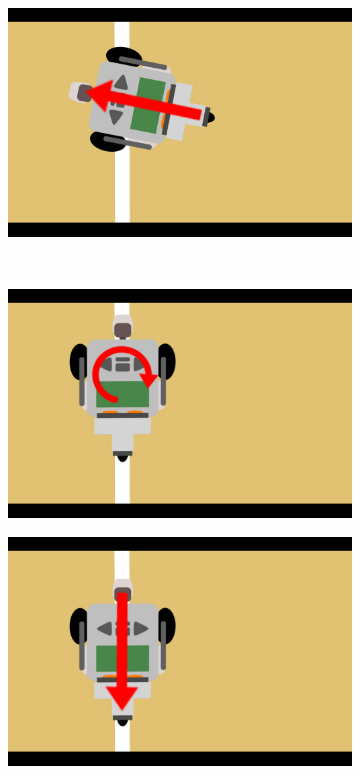 \documentclass[tt3]{penoverslag}
\begin{document}
\begin{figure}
\begin{subfigure}[h]{0.24\textwidth}
		\caption{}
		\label{fig:AlgoWit3}
	\end{subfigure}
	\begin{subfigure}[h]{0.24\textwidth}
		\includegraphics[width=\textwidth]{WitteLijn4}
		\caption{}
		\label{fig:AlgoWit4}
	\end{subfigure}\\ \vspace{0.2cm}
	\begin{subfigure}[h]{0.24\textwidth}
		\includegraphics[width=\textwidth]{WitteLijn5}
		\caption{}
		\label{fig:AlgoWit5}
	\end{subfigure}
	\begin{subfigure}[h]{0.24\textwidth}
		\includegraphics[width=\textwidth]{WitteLijn6}

\end{subfigure}
\end{figure}
\end{document}
